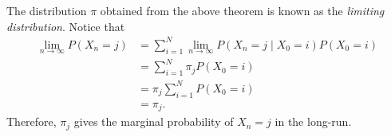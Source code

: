 \documentclass[math, code]{amznotes}
\theoremstyle{remark}
\begin{document}
The distribution $\pi$ obtained from the above theorem is known as the \textit{limiting distribution}. Notice that 
\begin{align*}
    \lim_{n \to \infty}P\left(X_n = j\right) & = \sum_{i = 1}^{N} \lim_{n \to \infty}P\left(X_n = j \mid X_0 = i\right)P\left(X_0 = i\right) \\
    & = \sum_{i = 1}^{N}\pi_jP\left(X_0 = i\right) \\
    & = \pi_j\sum_{i = 1}^{N}P\left(X_0 = i\right) \\
    & = \pi_j.
\end{align*}
Therefore, $\pi_j$ gives the marginal probability of $X_n = j$ in the long-run.
\end{document}
